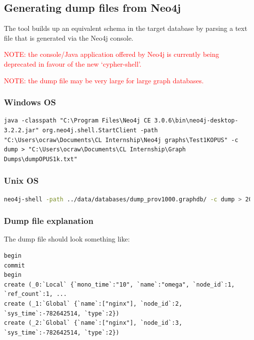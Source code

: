 \documentclass[letterpaper]{ltxdoc}
\begin{document}
\subsection{Generating dump files from Neo4j}
The tool builds up an equivalent schema in the target database by parsing a text file that is generated via the Neo4j console.

\medskip

\textcolor{red}{NOTE: the console/Java application offered by Neo4j is currently being deprecated in favour of the new `cypher-shell'.}

\medskip

\textcolor{red}{NOTE: the dump file may be very large for large graph databases.}

\subsubsection{Windows OS}
\begin{lstlisting}[style=DOS]
java -classpath "C:\Program Files\Neo4j CE 3.0.6\bin\neo4j-desktop-3.2.2.jar" org.neo4j.shell.StartClient -path "C:\Users\ocraw\Documents\CL Internship\Neo4j graphs\Test1KOPUS" -c dump > "C:\Users\ocraw\Documents\CL Internship\Graph Dumps\dumpOPUS1k.txt"
\end{lstlisting}

\subsubsection{Unix OS}
\begin{lstlisting}[language=bash, breaklines=true, postbreak=\mbox{\textcolor{red}{$\hookrightarrow$}\space}, backgroundcolor=\color{gray}, basicstyle=\color{white}\ttfamily]
neo4j-shell -path ../data/databases/dump_prov1000.graphdb/ -c dump > 2017-08-01-dump.txt
\end{lstlisting}


\subsubsection{Dump file explanation}
The dump file should look something like:

\begin{verbatim}
begin
commit
begin
create (_0:`Local` {`mono_time`:"10", `name`:"omega", `node_id`:1, `ref_count`:1, ...
create (_1:`Global` {`name`:["nginx"], `node_id`:2, `sys_time`:-782642514, `type`:2})
create (_2:`Global` {`name`:["nginx"], `node_id`:3, `sys_time`:-782642514, `type`:2})
\end{verbatim}
\end{document}
